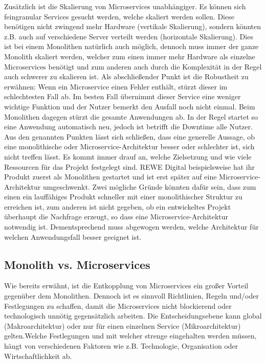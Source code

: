Zusätzlich ist die Skalierung von Microservices unabhängiger. Es können sich feingranular Services gesucht werden, welche skaliert werden sollen. Diese benötigen nicht zwingend mehr Hardware (vertikale Skalierung), sondern könnten z.B. auch auf verschiedene Server verteilt werden (horizontale Skalierung). Dies ist bei einem Monolithen natürlich auch möglich, dennoch muss immer der ganze Monolith skaliert werden, welcher zum einen immer mehr Hardware als einzelne Microservices benötigt und zum anderen auch durch die Komplexität in der Regel auch schwerer zu skalieren ist.\cite{wolff2018mic_praxis}   
Als abschließender Punkt ist die Robustheit zu erwähnen: Wenn ein Microservice einen Fehler enthält, stürzt dieser im schlechtesten Fall ab. Im besten Fall übernimmt dieser Service eine weniger wichtige Funktion und der Nutzer bemerkt den Ausfall noch nicht einmal. Beim Monolithen dagegen stürzt die gesamte Anwendungen ab. In der Regel startet so eine Anwendung automatisch neu, jedoch ist betrifft die Downtime alle Nutzer. \\

Aus den genannten Punkten lässt sich schließen, dass eine generelle Aussage, ob eine monolithische oder Microservice-Architektur besser oder schlechter ist, sich nicht treffen lässt. Es kommt immer drauf an, welche Zielsetzung und wie viele Ressourcen für das Projekt festgelegt sind. REWE Digital beispielsweise hat ihr Produkt zuerst als Monolithen gestartet und ist erst später auf eine Microservice-Architektur umgeschwenkt.\cite{rewe2019mic_ppp} Zwei mögliche Gründe könnten dafür sein, dass zum einen ein lauffähiges Produkt schneller mit einer monolithischer Struktur zu erreichen ist, zum anderen ist nicht gegeben, ob ein entwickeltes Projekt überhaupt die Nachfrage erzeugt, so dass eine Microservice-Architektur notwendig ist. Dementsprechend muss abgewogen werden, welche Architektur für welchen Anwendungsfall besser geeignet ist.\cite{wolff2018mic_praxis} 

\subsection{Monolith vs. Microservices}

Wie bereits erwähnt, ist die Entkopplung von Microservices ein großer Vorteil gegenüber dem Monolithen. Dennoch ist es sinnvoll Richtlinien, Regeln und/oder Festlegungen zu schaffen, damit die Microservices nicht blockierend oder technologisch unnötig gegensätzlich arbeiten. Die Entscheidungsebene kann global (Makroarchitektur) oder nur für einen einzelnen Service (Mikroarchitektur) gelten.Welche Festlegungen und mit welcher strenge eingehalten werden müssen, hängt von verschiedenen Faktoren wie z.B. Technologie, Organisation oder Wirtschaftlichkeit ab.\\ 

